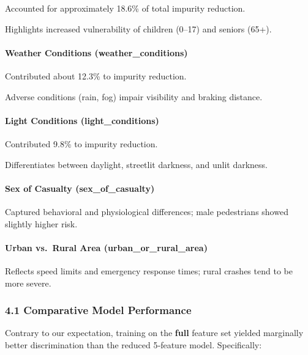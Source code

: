 \documentclass[
]{article}
\begin{document}
Accounted for approximately 18.6\% of total impurity reduction.

Highlights increased vulnerability of children (0--17) and seniors
(65+).

\paragraph{Weather Conditions
(weather\_conditions)}\label{weather-conditions-weather_conditions}

Contributed about 12.3\% to impurity reduction.

Adverse conditions (rain, fog) impair visibility and braking distance.

\paragraph{Light Conditions
(light\_conditions)}\label{light-conditions-light_conditions}

Contributed 9.8\% to impurity reduction.

Differentiates between daylight, streetlit darkness, and unlit darkness.

\paragraph{Sex of Casualty
(sex\_of\_casualty)}\label{sex-of-casualty-sex_of_casualty}

Captured behavioral and physiological differences; male pedestrians
showed slightly higher risk.

\paragraph{Urban vs.~Rural Area
(urban\_or\_rural\_area)}\label{urban-vs.-rural-area-urban_or_rural_area}

Reflects speed limits and emergency response times; rural crashes tend
to be more severe.

\subsubsection{4.1 Comparative Model
Performance}\label{comparative-model-performance}

Contrary to our expectation, training on the \textbf{full} feature set
yielded marginally better discrimination than the reduced 5‑feature
model. Specifically:
\end{document}
